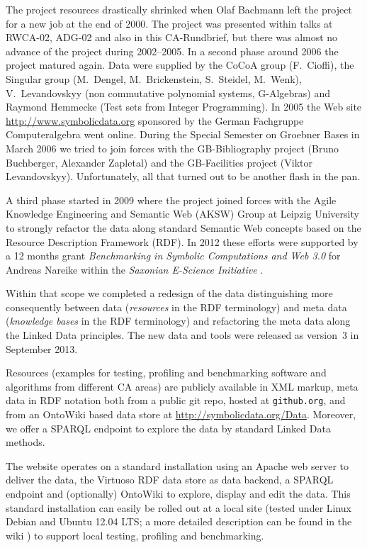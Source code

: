 \documentclass[a4paper,11pt]{article}
\begin{document}
\begin{multicols}{2}
The project resources drastically shrinked when Olaf Bachmann left the project
for a new job at the end of 2000.  The project was presented within talks at
RWCA-02, ADG-02 and also in this CA-Rundbrief, but there was almost no advance
of the project during 2002--2005.  In a second phase around 2006 the project
matured again. Data were supplied by the CoCoA group (F.~Cioffi), the Singular
group (M.~Dengel, M.~Brickenstein, S.~Steidel, M.~Wenk), V.~Levandovskyy (non
commutative polynomial systems, G-Algebras) and Raymond Hemmecke (Test sets
from Integer Programming). In 2005 the Web site
\url{http://www.symbolicdata.org} sponsored by the German Fachgruppe
Computeralgebra went online.  During the Special Semester on Groebner Bases in
March 2006 we tried to join forces with the GB-Bibliography project (Bruno
Buchberger, Alexander Zapletal) and the GB-Facilities project (Viktor
Levandovskyy). Unfortunately, all that turned out to be another flash in the
pan.

A third phase started in 2009 where the project joined forces with the Agile
Knowledge Engineering and Semantic Web (AKSW) Group at Leipzig University
\cite{AKSW} to strongly refactor the data along standard Semantic Web concepts
based on the Resource Description Framework (RDF).  In 2012 these efforts were
supported by a 12 months grant \emph{Benchmarking in Symbolic Computations and
  Web 3.0} for Andreas Nareike within the \emph{Saxonian E-Science
  Initiative} \cite{E-Science-Sachsen}.

Within that scope we completed a redesign of the data distinguishing more
consequently between data (\emph{resources} in the RDF terminology) and meta
data (\emph{knowledge bases} in the RDF terminology) and refactoring the meta
data along the Linked Data principles.  The new {\SD} data and tools were
released as version~3 in September 2013.

Resources (examples for testing, profiling and benchmarking software and
algorithms from different CA areas) are publicly available in XML markup, meta
data in RDF notation both from a public git repo, hosted at
\texttt{github.org}, and from an OntoWiki \cite{OntoWiki} based data store at
\url{http://symbolicdata.org/Data}.  Moreover, we offer a SPARQL endpoint
\cite{sdsparql} to explore the data by standard Linked Data methods.

The website operates on a standard installation using an Apache web server to
deliver the data, the Virtuoso RDF data store \cite{Virtuoso} as data backend,
a SPARQL endpoint and (optionally) OntoWiki to explore, display and edit the
data.  This standard installation can easily be rolled out at a local site
(tested under Linux Debian and Ubuntu 12.04 LTS; a more detailed description
can be found in the {\SD} wiki \cite{sdwiki}) to support local testing,
profiling and benchmarking.


\end{multicols}
\end{document}
